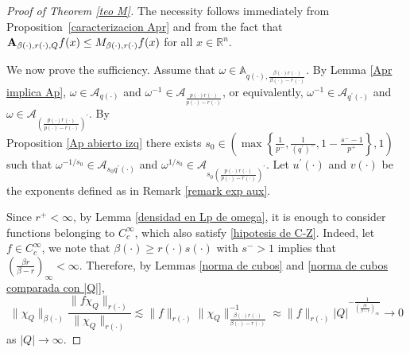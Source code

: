 \documentclass[a4paper,11pt,reqno]{amsart}
\theoremstyle{plain}
\numberwithin{equation}{section}
\theoremstyle{definition}
\newcommand{\R}{{\mathbb{R}^n}}
\begin{document}
\begin{proof}[Proof of Theorem \ref{teo M}]
	The necessity follows immediately from Proposition~\ref{caracterizacion Apr} and from the fact that ${\bf A}_{{\beta(\cdot)},{r(\cdot)},Q}f(x)\leq M_{{\beta(\cdot)},{r(\cdot)}}f(x)$ for all $x\in\R$.
	 
	We now prove the sufficiency. Assume that $\omega\in \mathbb{A}_{{q(\cdot)},\frac{{\beta(\cdot)}{r(\cdot)}}{{\beta(\cdot)}-{r(\cdot)}}}$. By Lemma \ref{Apr implica Ap}, $\omega\in \mathcal{A}_{q(\cdot)}$ and $\omega^{-1}\in\mathcal{A}_{\frac{{p(\cdot)}{r(\cdot)}}{{p(\cdot)}-{r(\cdot)}}}$, or equivalently, $\omega^{-1}\in \mathcal{A}_{q^\prime(\cdot)}$ and $\omega\in\mathcal{A}_{\left(\frac{{p(\cdot)}{r(\cdot)}}{{p(\cdot)}-{r(\cdot)}}\right)^\prime}$. By \\Proposition \ref{Ap abierto izq} there exists $s_0\in\left( \max\left\{\frac{1}{p^-},\frac{1}{(q^\prime)^-},1-\frac{s^--1}{p^+}\right\},1\right)$ such that $\omega^{-1/s_0}\in \mathcal{A}_{s_0{q^\prime(\cdot)}}$ and $\omega^{1/s_0}\in\mathcal{A}_{s_0\left(\frac{{p(\cdot)}{r(\cdot)}}{{p(\cdot)}-{r(\cdot)}}\right)^\prime}$. Let ${u^\prime(\cdot)}$ and ${v(\cdot)}$ be the exponents defined as in Remark \ref{remark exp aux}. 
	
	Since $r^+<\infty$, by Lemma \ref{densidad en Lp de omega}, it is enough to consider functions belonging to $C_c^\infty$, which also satisfy \eqref{hipotesis de C-Z}. Indeed, let $f\in C^\infty_c$, we note that $\beta(\cdot)\geq r(\cdot)s(\cdot)$ with $s^->1$ implies that $\left(\frac{\beta r}{\beta-r}\right)_\infty<\infty$. Therefore, by Lemmas \ref{norma de cubos} and \ref{norma de cubos comparada con |Q|}, 
	\begin{equation*}
	\|\chi_Q\|_{\beta(\cdot)}\frac{\|f\chi_Q\|_{r(\cdot)}}{\|\chi_Q\|_{r(\cdot)}}\lesssim\|f\|_{r(\cdot)}\|\chi_Q\|^{-1}_{\frac{\beta(\cdot) r(\cdot)}{\beta(\cdot)-r(\cdot)}}\approx\|f\|_{r(\cdot)}|Q|^{-\frac{1}{\left(\frac{\beta r}{\beta-r}\right)_\infty}}\to 0
	\end{equation*}
	as $|Q|\to \infty$.
	

\end{proof}
\end{document}
